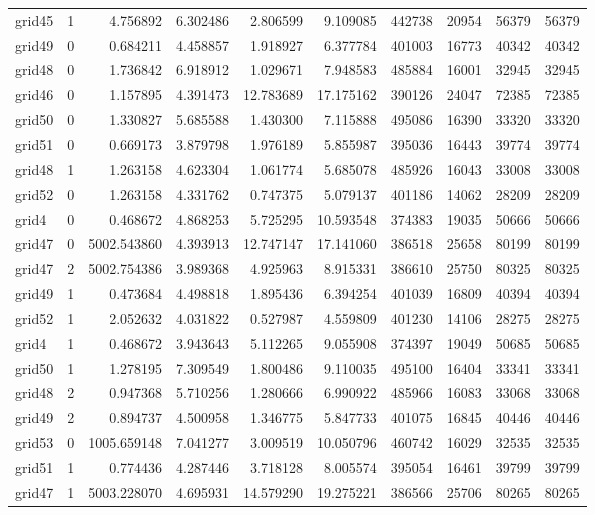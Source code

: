 \begin{longtable}{|l|r|r|r|r|r|r|r|r|r|}
grid45 & 1 & 4.756892 & 6.302486 & 2.806599 & 9.109085 & 442738 & 20954 & 56379 & 56379 \\
grid49 & 0 & 0.684211 & 4.458857 & 1.918927 & 6.377784 & 401003 & 16773 & 40342 & 40342 \\
grid48 & 0 & 1.736842 & 6.918912 & 1.029671 & 7.948583 & 485884 & 16001 & 32945 & 32945 \\
grid46 & 0 & 1.157895 & 4.391473 & 12.783689 & 17.175162 & 390126 & 24047 & 72385 & 72385 \\
grid50 & 0 & 1.330827 & 5.685588 & 1.430300 & 7.115888 & 495086 & 16390 & 33320 & 33320 \\
grid51 & 0 & 0.669173 & 3.879798 & 1.976189 & 5.855987 & 395036 & 16443 & 39774 & 39774 \\
grid48 & 1 & 1.263158 & 4.623304 & 1.061774 & 5.685078 & 485926 & 16043 & 33008 & 33008 \\
grid52 & 0 & 1.263158 & 4.331762 & 0.747375 & 5.079137 & 401186 & 14062 & 28209 & 28209 \\
grid4 & 0 & 0.468672 & 4.868253 & 5.725295 & 10.593548 & 374383 & 19035 & 50666 & 50666 \\
grid47 & 0 & 5002.543860 & 4.393913 & 12.747147 & 17.141060 & 386518 & 25658 & 80199 & 80199 \\
grid47 & 2 & 5002.754386 & 3.989368 & 4.925963 & 8.915331 & 386610 & 25750 & 80325 & 80325 \\
grid49 & 1 & 0.473684 & 4.498818 & 1.895436 & 6.394254 & 401039 & 16809 & 40394 & 40394 \\
grid52 & 1 & 2.052632 & 4.031822 & 0.527987 & 4.559809 & 401230 & 14106 & 28275 & 28275 \\
grid4 & 1 & 0.468672 & 3.943643 & 5.112265 & 9.055908 & 374397 & 19049 & 50685 & 50685 \\
grid50 & 1 & 1.278195 & 7.309549 & 1.800486 & 9.110035 & 495100 & 16404 & 33341 & 33341 \\
grid48 & 2 & 0.947368 & 5.710256 & 1.280666 & 6.990922 & 485966 & 16083 & 33068 & 33068 \\
grid49 & 2 & 0.894737 & 4.500958 & 1.346775 & 5.847733 & 401075 & 16845 & 40446 & 40446 \\
grid53 & 0 & 1005.659148 & 7.041277 & 3.009519 & 10.050796 & 460742 & 16029 & 32535 & 32535 \\
grid51 & 1 & 0.774436 & 4.287446 & 3.718128 & 8.005574 & 395054 & 16461 & 39799 & 39799 \\
grid47 & 1 & 5003.228070 & 4.695931 & 14.579290 & 19.275221 & 386566 & 25706 & 80265 & 80265 \\

\end{longtable}
